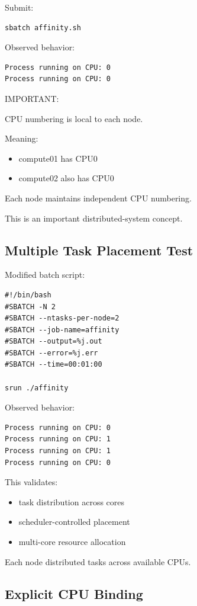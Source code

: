 \documentclass[11pt]{article}
\begin{document}
Submit:

\begin{verbatim}
sbatch affinity.sh
\end{verbatim}

Observed behavior:

\begin{verbatim}
Process running on CPU: 0
Process running on CPU: 0
\end{verbatim}

IMPORTANT:

CPU numbering is local to each node.

Meaning:

\begin{itemize}
\item compute01 has CPU0
\item compute02 also has CPU0
\end{itemize}

Each node maintains independent CPU numbering.

This is an important distributed-system concept.
\subsection{Multiple Task Placement Test}
\label{sec:orga14b198}

Modified batch script:

\begin{verbatim}
#!/bin/bash
#SBATCH -N 2
#SBATCH --ntasks-per-node=2
#SBATCH --job-name=affinity
#SBATCH --output=%j.out
#SBATCH --error=%j.err
#SBATCH --time=00:01:00

srun ./affinity
\end{verbatim}

Observed behavior:

\begin{verbatim}
Process running on CPU: 0
Process running on CPU: 1
Process running on CPU: 1
Process running on CPU: 0
\end{verbatim}

This validates:

\begin{itemize}
\item task distribution across cores
\item scheduler-controlled placement
\item multi-core resource allocation
\end{itemize}

Each node distributed tasks across available CPUs.
\subsection{Explicit CPU Binding}
\label{sec:orge59c6a6}
\end{document}
